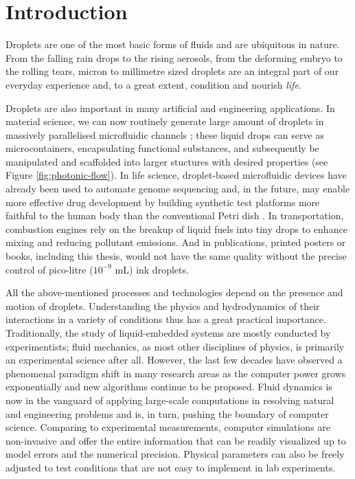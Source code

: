 \graphicspath{{imgs/}}

\chapter{Introduction}

Droplets are one of the most basic forms of fluids and are ubiquitous in nature.
From the falling rain drops to the rising aerosols, from the deforming embryo to the rolling tears, micron to millimetre sized droplets are an integral part of our everyday experience and, to a great extent, condition and nourish \emph{life}.

Droplets are also important in many artificial and engineering applications.
In material science, we can now routinely generate large amount of droplets in massively parallelised microfluidic channels \citep{microfluidics}; these liquid drops can serve as microcontainers, encapsulating functional substances, and subsequently be manipulated and scaffolded into larger stuctures with desired properties (see Figure \ref{fig:photonic-flow}).
In life science, droplet-based microfluidic devices have already been used to automate genome sequencing and, in the future, may enable more effective drug development by building synthetic test platforms more faithful to the human body than the conventional Petri dish \citep{Squires_Quakes_2005, organs-on-chips}.
In transportation, combustion engines rely on the breakup of liquid fuels into tiny drops to enhance mixing and reducing pollutant emissions.
And in publications, printed posters or books, including this thesis, would not have the same quality without the precise control of pico-litre ($10^{-9}$ mL) ink droplets.

All the above-mentioned processes and technologies depend on the presence and motion of droplets.
Understanding the physics and hydrodynamics of their interactions in a variety of conditions thus has a great practical importance.
Traditionally, the study of liquid-embedded systems are mostly conducted by experimentists; fluid mechanics, as most other disciplines of physics, is primarily an experimental science after all.
However, the last few decades have observed a phenomenal paradigm shift in many research areas as the computer power grows exponentially and new algorithms continue to be proposed.
Fluid dynamics is now in the vanguard of applying large-scale computations in resolving natural and engineering problems and is, in turn, pushing the boundary of computer science.
Comparing to experimental measurements, computer simulations are non-invasive and offer the entire information that can be readily visualized up to model errors and the numerical precision.
Physical parameters can also be freely adjusted to test conditions that are not easy to implement in lab experiments.


